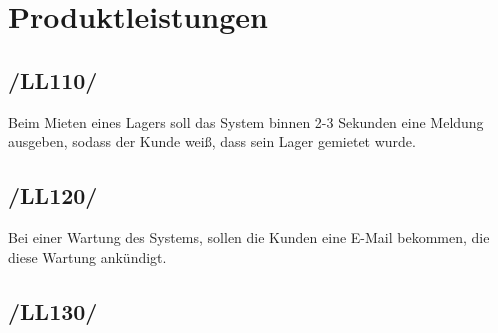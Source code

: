 
\section{Produktleistungen}
\subsection*{/LL110/}
Beim Mieten eines Lagers soll das System binnen 2-3 Sekunden eine Meldung ausgeben, sodass der Kunde weiß, dass sein Lager gemietet wurde.
\subsection*{/LL120/}
Bei einer Wartung des Systems, sollen die Kunden eine E-Mail bekommen, die diese Wartung ankündigt.
\subsection*{/LL130/}

